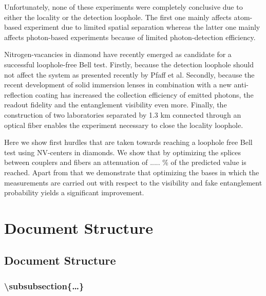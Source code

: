 Unfortunately, none of these experiments were completely conclusive due to either the locality or the detection loophole. The first one mainly affects atom-based experiment due to limited spatial separation whereas the latter one mainly affects photon-based experiments because of limited photon-detection efficiency. 

Nitrogen-vacancies in diamond have recently emerged as candidate for a successful loophole-free Bell test. Firstly, because the detection loophole should not affect the system as presented recently by Pfaff et al. \cite{pfaff2014unconditional} Secondly, because the recent development of solid immersion lenses in combination with a new anti-reflection coating has increased the collection efficiency of emitted photons, the readout fidelity and the entanglement visibility even more. Finally, the construction of two laboratories separated by 1.3 km connected through an optical fiber enables the experiment necessary to close the locality loophole.  

Here we show first hurdles that are taken towards reaching a loophole free Bell test using NV-centers in diamonds. We show that by optimizing the splices between couplers and fibers an attenuation of ..... \% of the predicted value is reached. Apart from that we demonstrate that optimizing the bases in which the measurements are carried out with respect to the visibility and fake entanglement probability yields a significant improvement.


\color{tudelft-cyan}
\section{Document Structure}
\color{black}

\color{tudelft-cyan}
\subsection{Document Structure}
\color{black}

\subsubsection{\textbackslash subsubsection\{\ldots\}}




